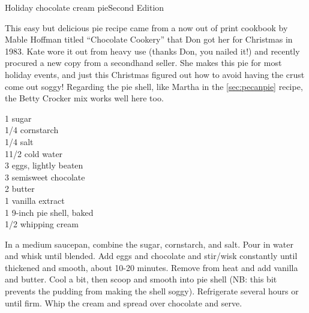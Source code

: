 \begin{entry}{Holiday chocolate cream pie}{Second Edition}

\begin{open}
  This easy but delicious pie recipe came from a now out of print cookbook by
  Mable Hoffman titled ``Chocolate Cookery'' that Don got her for Christmas in
  1983. Kate wore it out from heavy use (thanks Don, you nailed it!) and
  recently procured a new copy from a secondhand seller. She makes this pie
  for most holiday events, and just this Christmas figured out how to avoid
  having the crust come out soggy! Regarding the pie shell, like Martha in the
  \ref{sec:pecanpie} recipe, the Betty Crocker mix works well here too.
\end{open}
\begin{ingredients}
    \SI{1}{\cup} sugar\\
    \SI{1/4}{\cup} cornstarch\\
    \SI{1/4}{\teaspoon} salt\\
    1\SI{1/2}{\cup} cold water\\
    3 eggs, lightly beaten \\
    \SI{3}{\ounce} semisweet chocolate \\
    \SI{2}{\tblspoon} butter \\
    \SI{1}{\teaspoon} vanilla extract\\
    1 9-inch pie shell, baked \\
    \SI{1/2}{\cup} whipping cream
\end{ingredients}
In a medium saucepan, combine the sugar, cornstarch, and salt. Pour in water
and whisk until blended. Add eggs and chocolate and stir/wisk constantly until
thickened and smooth, about 10-20 minutes. Remove from heat and add vanilla
and butter. Cool a bit, then scoop and smooth into pie shell (NB: this bit
prevents the pudding from making the shell soggy). Refrigerate several hours
or until firm. Whip the cream and spread over chocolate and serve.
\end{entry}

